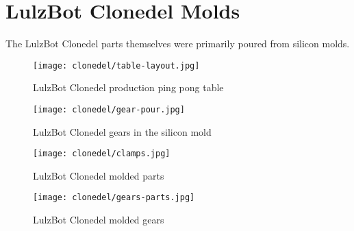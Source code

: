 %
%
%
%
%

\section{LulzBot Clonedel Molds}
The LulzBot Clonedel parts themselves were primarily poured from silicon molds.

\begin{figure}[h!]
\texttt{[image: clonedel/table-layout.jpg]}
 \caption{LulzBot Clonedel production ping pong table}
 \label{fig:clonedel-table-layout}
\end{figure}

\begin{figure}[h!]
\texttt{[image: clonedel/gear-pour.jpg]}
 \caption{LulzBot Clonedel gears in the silicon mold}
 \label{fig:clonedel-gear-pour}
\end{figure}

\begin{figure}[h!]
\texttt{[image: clonedel/clamps.jpg]}
 \caption{LulzBot Clonedel molded parts}
 \label{fig:clonedel-clamps}
\end{figure}

\begin{figure}[h!]
\texttt{[image: clonedel/gears-parts.jpg]}
 \caption{LulzBot Clonedel molded gears}
 \label{fig:clonedel-gears-parts}
\end{figure}

